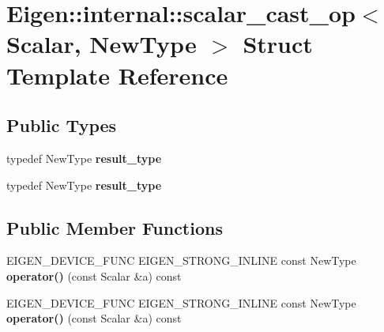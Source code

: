 \hypertarget{struct_eigen_1_1internal_1_1scalar__cast__op}{}\section{Eigen\+:\+:internal\+:\+:scalar\+\_\+cast\+\_\+op$<$ Scalar, New\+Type $>$ Struct Template Reference}
\label{struct_eigen_1_1internal_1_1scalar__cast__op}
\subsection*{Public Types}
\begin{DoxyCompactItemize}
\item 
\mbox{\label{struct_eigen_1_1internal_1_1scalar__cast__op_a23d6b1bfca1b90cba6c16f62a6305b02}} 
typedef New\+Type {\bfseries result\+\_\+type}
\item 
\mbox{\label{struct_eigen_1_1internal_1_1scalar__cast__op_a23d6b1bfca1b90cba6c16f62a6305b02}} 
typedef New\+Type {\bfseries result\+\_\+type}
\end{DoxyCompactItemize}
\subsection*{Public Member Functions}
\begin{DoxyCompactItemize}
\item 
\mbox{\label{struct_eigen_1_1internal_1_1scalar__cast__op_a2079c49e97a191b26a150b07e2a19e98}} 
E\+I\+G\+E\+N\+\_\+\+D\+E\+V\+I\+C\+E\+\_\+\+F\+U\+NC E\+I\+G\+E\+N\+\_\+\+S\+T\+R\+O\+N\+G\+\_\+\+I\+N\+L\+I\+NE const New\+Type {\bfseries operator()} (const Scalar \&a) const
\item 
\mbox{\label{struct_eigen_1_1internal_1_1scalar__cast__op_a2079c49e97a191b26a150b07e2a19e98}} 
E\+I\+G\+E\+N\+\_\+\+D\+E\+V\+I\+C\+E\+\_\+\+F\+U\+NC E\+I\+G\+E\+N\+\_\+\+S\+T\+R\+O\+N\+G\+\_\+\+I\+N\+L\+I\+NE const New\+Type {\bfseries operator()} (const Scalar \&a) const
\end{DoxyCompactItemize}


